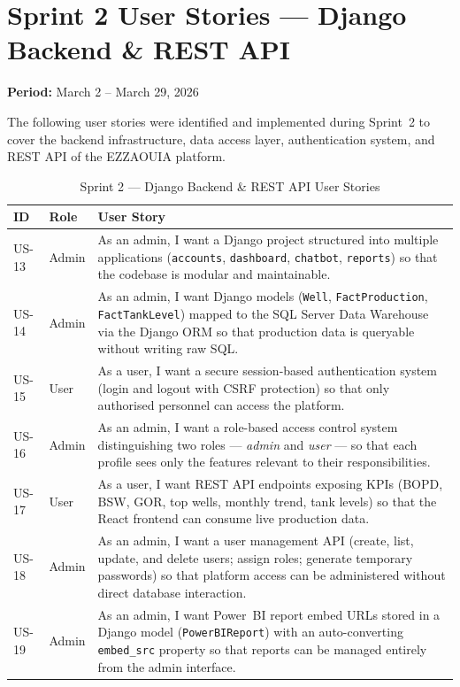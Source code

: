 \section{Sprint 2 User Stories --- Django Backend \& REST API}
\begin{sloppypar}

\textbf{Period:} March 2 -- March 29, 2026

\noindent The following user stories were identified and implemented during
Sprint~2 to cover the backend infrastructure, data access layer, authentication
system, and REST API of the EZZAOUIA platform.

\begin{table}[H]
\caption{Sprint 2 --- Django Backend \& REST API User Stories}
\centering
\renewcommand{\arraystretch}{1.5}
\begin{tabular}{|p{2cm}|p{2cm}|p{9.5cm}|}
\hline
\rowcolor{blue!15}
\textbf{ID} & \textbf{Role} & \textbf{User Story} \\ \hline
US-13 & Admin &
  As an admin, I want a Django project structured into multiple applications
  (\texttt{accounts}, \texttt{dashboard}, \texttt{chatbot}, \texttt{reports})
  so that the codebase is modular and maintainable. \\ \hline
\rowcolor{gray!10}
US-14 & Admin &
  As an admin, I want Django models (\texttt{Well}, \texttt{FactProduction},
  \texttt{FactTankLevel}) mapped to the SQL Server Data Warehouse via the Django
  ORM so that production data is queryable without writing raw SQL. \\ \hline
US-15 & User &
  As a user, I want a secure session-based authentication system (login and
  logout with CSRF protection) so that only authorised personnel can access the
  platform. \\ \hline
\rowcolor{gray!10}
US-16 & Admin &
  As an admin, I want a role-based access control system distinguishing two
  roles --- \textit{admin} and \textit{user} --- so that each profile sees only
  the features relevant to their responsibilities. \\ \hline
US-17 & User &
  As a user, I want REST API endpoints exposing KPIs (BOPD, BSW, GOR, top
  wells, monthly trend, tank levels) so that the React frontend can consume
  live production data. \\ \hline
\rowcolor{gray!10}
US-18 & Admin &
  As an admin, I want a user management API (create, list, update, and delete
  users; assign roles; generate temporary passwords) so that platform access can
  be administered without direct database interaction. \\ \hline
US-19 & Admin &
  As an admin, I want Power~BI report embed URLs stored in a Django model
  (\texttt{PowerBIReport}) with an auto-converting \texttt{embed\_src} property
  so that reports can be managed entirely from the admin interface. \\ \hline
\end{tabular}
\end{table}


\end{sloppypar}
